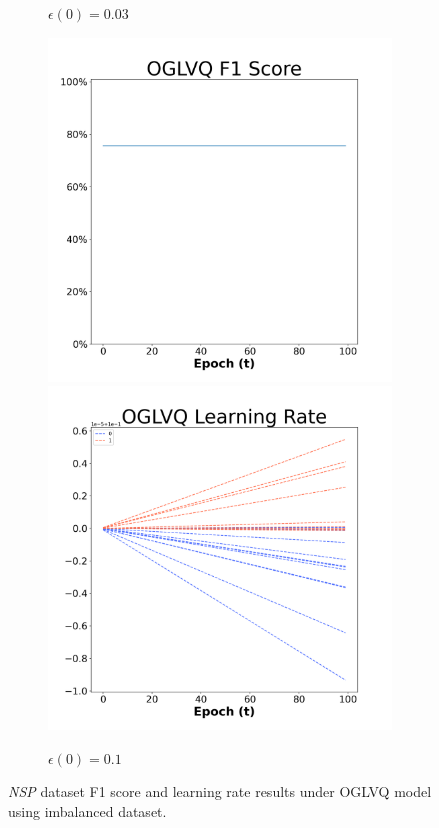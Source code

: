 \begin{figure}[H]
\begin{subfigure}{0.3\textwidth}
  \caption{$\epsilon(0)=0.03$}
\end{subfigure}\hfil %
\begin{subfigure}{0.3\textwidth}
  \includegraphics[width=\linewidth]{images/exper2/NSP/OGLVQ_0.1_f1.png}
  \includegraphics[width=\linewidth]{images/exper2/NSP/OGLVQ_0.1_lr.png}
  \caption{$\epsilon(0)=0.1$}
\end{subfigure}

\caption{\textit{NSP} dataset F1 score and learning rate results under OGLVQ model using imbalanced dataset.}
\end{figure}